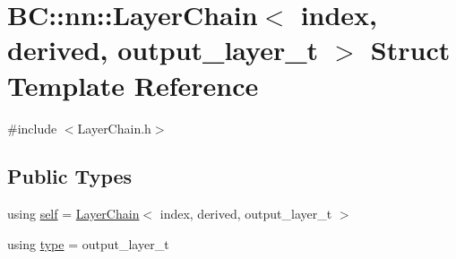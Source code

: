 \hypertarget{structBC_1_1nn_1_1LayerChain_3_01index_00_01derived_00_01output__layer__t_01_4}{}\section{BC\+:\+:nn\+:\+:Layer\+Chain$<$ index, derived, output\+\_\+layer\+\_\+t $>$ Struct Template Reference}
\label{structBC_1_1nn_1_1LayerChain_3_01index_00_01derived_00_01output__layer__t_01_4}


{\ttfamily \#include $<$Layer\+Chain.\+h$>$}

\subsection*{Public Types}
\begin{DoxyCompactItemize}
\item 
using \hyperlink{structBC_1_1nn_1_1LayerChain_3_01index_00_01derived_00_01output__layer__t_01_4_a49c206bb8331c9fa003194ad9c33a30f}{self} = \hyperlink{structBC_1_1nn_1_1LayerChain}{Layer\+Chain}$<$ index, derived, output\+\_\+layer\+\_\+t $>$
\item 
using \hyperlink{structBC_1_1nn_1_1LayerChain_3_01index_00_01derived_00_01output__layer__t_01_4_a0c63b4c0ab7b39412bff5581bc33db5d}{type} = output\+\_\+layer\+\_\+t
\end{DoxyCompactItemize}

